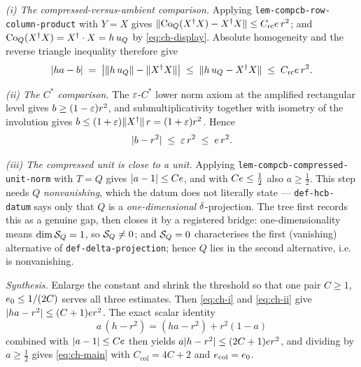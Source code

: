 \emph{(i) The compressed-versus-ambient comparison.} Applying
\texttt{lem-compcb-row-column-product} with $Y=X$ gives
$\lVert \mathrm{Co}_{Q}(X^{\dagger} X)-X^{\dagger} X\rVert\le C_{\mathrm{rc}}e\,r^{2}$; and
$\mathrm{Co}_{Q}(X^{\dagger} X)=X^{\dagger}\mathbin{\cdot} X=h\,u_{Q}$ by \eqref{eq:ch-display}. Absolute homogeneity
and the reverse triangle inequality therefore give
\begin{equation}\label{eq:ch-i}
  \lvert ha-b\rvert\;=\;\bigl\lvert\lVert h\,u_{Q}\rVert-\lVert X^{\dagger} X\rVert\bigr\rvert
  \;\le\;\lVert h\,u_{Q}-X^{\dagger} X\rVert\;\le\;C_{\mathrm{rc}}e\,r^{2}.
\end{equation}

\emph{(ii) The $C^*$ comparison.} The $\varepsilon$-$C^*$ lower norm axiom at the amplified
rectangular level gives $b\ge(1-\varepsilon)r^{2}$, and submultiplicativity together with
isometry of the involution gives $b\le(1+\varepsilon)\lVert X^{\dagger}\rVert\,r=(1+\varepsilon)r^{2}$. Hence
\begin{equation}\label{eq:ch-ii}
  \lvert b-r^{2}\rvert\;\le\;\varepsilon\,r^{2}\;\le\;e\,r^{2}.
\end{equation}

\emph{(iii) The compressed unit is close to a unit.} Applying
\texttt{lem-compcb-compressed-unit-norm} with $T=Q$ gives $\lvert a-1\rvert\le Ce$,
and with $Ce\le\tfrac12$ also $a\ge\tfrac12$. This step needs $Q$ \emph{nonvanishing},
which the datum does not literally state --- \texttt{def-hcb-datum} says only that $Q$ is
a \emph{one-dimensional} $\delta$-projection. The tree first records this as a genuine
gap, then closes it by a registered bridge: one-dimensionality means
$\dim\mathcal S_{Q}=1$, so $\mathcal S_{Q}\ne0$; and $\mathcal S_{Q}=0$ characterises the first (vanishing)
alternative of \texttt{def-delta-projection}; hence $Q$ lies in the second alternative,
i.e. is nonvanishing.

\emph{Synthesis.} Enlarge the constant and shrink the threshold so that one pair
$C\ge1$, $e_0\le1/(2C)$ serves all three estimates. Then \eqref{eq:ch-i} and
\eqref{eq:ch-ii} give $\lvert ha-r^{2}\rvert\le(C+1)e r^{2}$. The exact scalar identity
\begin{equation}\label{eq:ch-identity}
  a\,(h-r^{2})=(ha-r^{2})+r^{2}(1-a)
\end{equation}
combined with $\lvert a-1\rvert\le Ce$ then yields
$a\lvert h-r^{2}\rvert\le(2C+1)e r^{2}$, and dividing by $a\ge\tfrac12$ gives
\eqref{eq:ch-main} with $C_{\mathrm{col}}=4C+2$ and $e_{\mathrm{col}}=e_0$.

